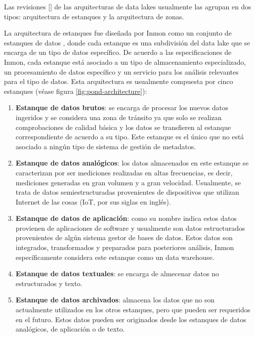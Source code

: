 Las revisiones [\cite*{giebler2019leveraging,ravat2019data}] de las arquitecturas de data lakes usualmente las agrupan en dos tipos: arquitectura de estanques y la arquitectura de zonas.

La arquitectura de estanques fue diseñada por Inmon como un conjunto de estanques de datos \cite{inmon2016data}, donde cada estanque es una
subdivisión del data lake que se encarga de un tipo de datos específico. De acuerdo a las especificaciones de Inmon, cada
estanque está asociado a un tipo de almacenamiento especializado, un procesamiento de datos específico y un servicio para los análisis
relevantes para el tipo de datos. Esta arquitectura es usualmente compuesta por cinco estanques (véase figura \ref{fig:pond-architecture}):

\begin{enumerate}
    \item \textbf{Estanque de datos brutos}: se encarga de procesar los nuevos datos ingeridos y se considera una
    zona de tránsito ya que solo se realizan comprobaciones de calidad básica y los datos se transfieren al estanque
    correspondiente de acuerdo a su tipo. Este estanque es el único que no está asociado a ningún tipo de sistema de gestión de metadatos.
    \item \textbf{Estanque de datos analógicos}: los datos almacenados en este estanque se caracterizan por ser mediciones realizadas en altas frecuencias, es decir,
    mediciones generadas en gran volumen y a gran velocidad. Usualmente, se trata de datos semiestructuradas provenientes de dispositivos
    que utilizan Internet de las cosas (IoT, por sus siglas en inglés).
    \item \textbf{Estanque de datos de aplicación}: como su nombre indica estos datos provienen de aplicaciones de software y usualmente son datos
    estructurados provenientes de algún sistema gestor de bases de datos. Estos datos son integrados, transformados y preparados para posteriores
    análisis, Inmon específicamente considera este estanque como un data warehouse.
    \item \textbf{Estanque de datos textuales}: se encarga de almecenar datos no estructurados y texto.
    \item \textbf{Estanque de datos archivados}: almacena los datos que no son actualmente utilizados en los otros estanques, pero que pueden
    ser requeridos en el futuro. Estos datos pueden ser originados desde los estanques de datos analógicos, de aplicación o de texto.
\end{enumerate}


